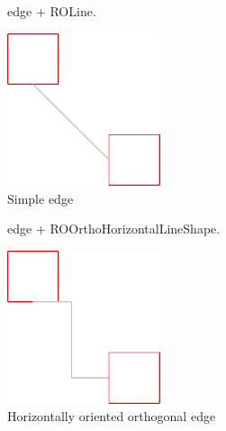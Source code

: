 \documentclass[a4paper,10pt,twoside]{book}
\begin{document}
\begin{figure}[H]
      \begin{minipage}[t]{0.5\textwidth}
      \vspace{0pt}
     \begin{code}{}
edge + ROLine. \end{code}
   \end{minipage}
   \hfill
   \begin{minipage}[t]{0.4\textwidth}
      \vspace{0pt} \raggedright
       \centering
		\includegraphics[width=0.4\textwidth]{line}
   \end{minipage}
\caption{Simple edge}
\label{fig:line}
\end{figure} 


\begin{figure}[H]
      \begin{minipage}[t]{0.5\textwidth}
      \vspace{0pt}
     \begin{code}{}
edge + ROOrthoHorizontalLineShape. \end{code}
   \end{minipage}
   \hfill
   \begin{minipage}[t]{0.4\textwidth}
      \vspace{0pt} \raggedright
       \centering
		\includegraphics[width=0.4\textwidth]{orthoEdge}
   \end{minipage}
\caption{Horizontally oriented orthogonal edge}
\label{fig:orthoEdge}
\end{figure} 
\end{document}
